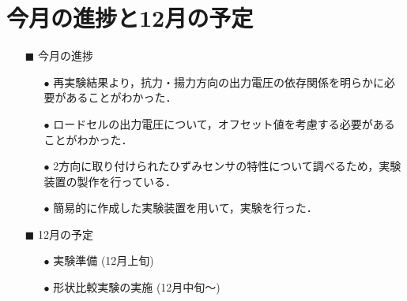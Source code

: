 \documentclass[twocolumn,a4j]{jsarticle}
\begin{document}
\section{今月の進捗と12月の予定}
\begin{itemize}
    \item [$\blacksquare$] 今月の進捗
          \begin{itemize}
              \item [$\bullet$] 再実験結果より，抗力・揚力方向の出力電圧の依存関係を明らかに必要があることがわかった．
              \item [$\bullet$] ロードセルの出力電圧について，オフセット値を考慮する必要があることがわかった．
              \item [$\bullet$] 2方向に取り付けられたひずみセンサの特性について調べるため，実験装置の製作を行っている．
              \item [$\bullet$] 簡易的に作成した実験装置を用いて，実験を行った．
          \end{itemize}
    \item [$\blacksquare$] 12月の予定
          \begin{itemize}
              \item [$\bullet$] 実験準備 (12月上旬)
              \item [$\bullet$] 形状比較実験の実施 (12月中旬～)
          \end{itemize}
\end{itemize}
\end{document}
